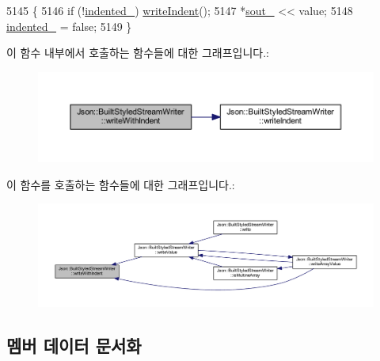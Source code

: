 \begin{DoxyCode}
5145                                                                          \{
5146   \textcolor{keywordflow}{if} (!\hyperlink{struct_json_1_1_built_styled_stream_writer_a6aa0ad023e623f600103631a6bca6d10}{indented\_}) \hyperlink{struct_json_1_1_built_styled_stream_writer_a2b38a3714d415c4bd3b4812897130f3d}{writeIndent}();
5147   *\hyperlink{class_json_1_1_stream_writer_a4f5603d4228a9fa46a42cb44e5234d9b}{sout\_} << value;
5148   \hyperlink{struct_json_1_1_built_styled_stream_writer_a6aa0ad023e623f600103631a6bca6d10}{indented\_} = \textcolor{keyword}{false};
5149 \}
\end{DoxyCode}
이 함수 내부에서 호출하는 함수들에 대한 그래프입니다.\+:\nopagebreak
\begin{figure}[H]
\begin{center}
\leavevmode
\includegraphics[width=350pt]{struct_json_1_1_built_styled_stream_writer_a6e80e1a0d5f64df2ec48c3c3b1284990_cgraph}
\end{center}
\end{figure}
이 함수를 호출하는 함수들에 대한 그래프입니다.\+:\nopagebreak
\begin{figure}[H]
\begin{center}
\leavevmode
\includegraphics[width=350pt]{struct_json_1_1_built_styled_stream_writer_a6e80e1a0d5f64df2ec48c3c3b1284990_icgraph}
\end{center}
\end{figure}


\subsection{멤버 데이터 문서화}
\mbox{\label{struct_json_1_1_built_styled_stream_writer_abed9cc31da503b48798e7cea68c42e16}} 
